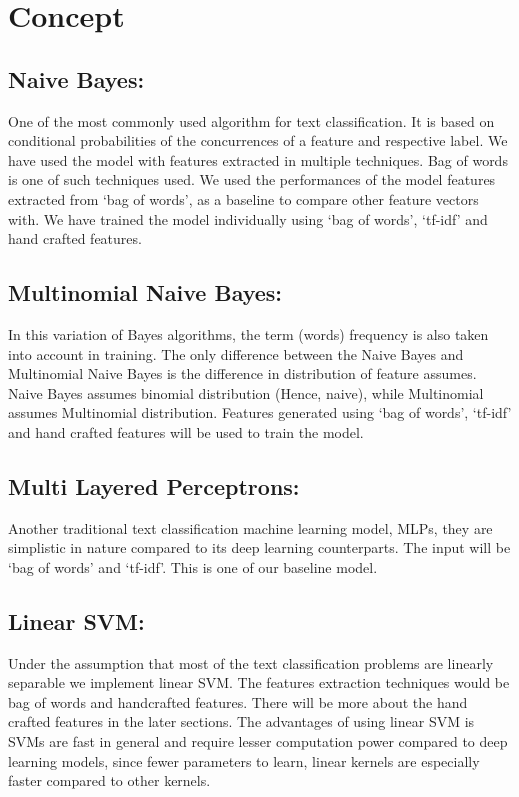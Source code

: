 \documentclass[conference]{IEEEtran}
\begin{document}
\section{Concept}
\subsection{Naive Bayes:}
\justify One of the most commonly used algorithm for text classification. It is based on conditional probabilities of the concurrences of a feature and respective label. We have used the model with features extracted in multiple techniques. Bag of words is one of such techniques used. We used the performances of the model features extracted from ‘bag of words’, as a baseline to compare other feature vectors with. We have trained the model individually using ‘bag of words’, ‘tf-idf’ and hand crafted features.
\subsection{Multinomial Naive Bayes:}
\justify In this variation of Bayes algorithms, the term (words) frequency is also taken into account in training. The only difference between the Naive Bayes and Multinomial Naive Bayes is the difference in distribution of feature assumes. Naive Bayes assumes binomial distribution (Hence, naive), while Multinomial assumes Multinomial distribution. Features generated using ‘bag of words’, ‘tf-idf’ and hand crafted features will be used to train the model.
\subsection{Multi Layered Perceptrons:}
\justify Another traditional text classification machine learning model, MLPs, they are simplistic in nature compared to its deep learning\cite{Worsham2018} counterparts. The input will be ‘bag of words’ and ‘tf-idf’. This is one of our baseline model. 
\subsection{Linear SVM:}
\justify Under the assumption that most of the text classification problems are linearly separable we implement linear SVM. The features extraction techniques would be bag of words and handcrafted features. There will be more about the hand crafted features in the later sections. The advantages of using linear SVM is SVMs are fast in general and require lesser computation power compared to deep learning models, since fewer parameters to learn, linear kernels are especially faster compared to other kernels. 
\end{document}

